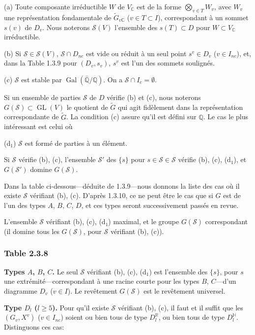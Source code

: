 \documentclass[12pt,a4paper]{article}
\theoremstyle{plain}
\theoremstyle{definition}
\theoremstyle{remark}
\DeclareMathOperator{\GL}{GL}
\DeclareMathOperator{\Gal}{Gal}
\newcommand{\QQ}{\mathbb{Q}}
\newcommand{\RR}{\mathbb{R}}
\newcommand{\CC}{\mathbb{C}}
\begin{document}
(a) Toute composante irr\'eductible $W$ de $V_{\CC}$ est de la forme $\bigotimes_{v \in T} W_v$, avec $W_v$ une repr\'esentation fondamentale de $\tilde{G}_{v\CC}$ ($v \in T \subset I$), correspondant \`a un sommet $s(v)$ de $D_v$. Nous noterons $\mathcal{S}(V)$ l'ensemble des $s(T) \subset D$ pour $W \subset V_{\CC}$ irr\'eductible.

(b) Si $\mathcal{S} \in \mathcal{S}(V)$, $\mathcal{S} \cap D_{nc}$ est vide ou r\'eduit \`a un seul point $s^v \in D_v$ ($v \in I_{nc}$), et, dans la Table 1.3.9 pour $(D_v, s_v)$, $s^v$ est l'un des sommets soulign\'es.

(c) $\mathcal{S}$ est stable par $\Gal(\overline{\QQ}/\QQ)$. On a $\mathcal{S} \cap I_c = \emptyset$.

Si un ensemble de parties $\mathcal{S}$ de $D$ v\'erifie (b) et (c), nous noterons $G(\mathcal{S}) \subset \GL(V)$ le quotient de $\tilde{G}$ qui agit fid\`element dans la repr\'esentation correspondante de $\tilde{G}$. La condition (c) assure qu'il est d\'efini sur $\QQ$. Le cas le plus int\'eressant est celui o\`u

(d$_1$) $\mathcal{S}$ est form\'e de parties \`a un \'el\'ement.

Si $\mathcal{S}$ v\'erifie (b), (c), l'ensemble $\mathcal{S}'$ des $\{s\}$ pour $s \in \mathcal{S} \in \mathcal{S}$ v\'erifie (b), (c), (d$_1$), et $G(\mathcal{S}')$ domine $G(\mathcal{S})$.

Dans la table ci-dessous---d\'eduite de 1.3.9---nous donnons la liste des cas o\`u il existe $\mathcal{S}$ v\'erifiant (b), (c). D'apr\`es 1.3.10, ce ne peut \^etre le cas que si $G$ est de l'un des types $A$, $B$, $C$, $D$, et ces types seront successivement pass\'es en revue.

L'ensemble $\mathcal{S}$ v\'erifiant (b), (c), (d$_1$) maximal, et le groupe $G(\mathcal{S})$ correspondant (il domine tous les $G(\mathcal{S})$, pour $\mathcal{S}$ v\'erifiant (b), (c)).

\subsubsection*{Table 2.3.8}

\textbf{Types $A$, $B$, $C$.} Le seul $\mathcal{S}$ v\'erifiant (b), (c), (d$_1$) est l'ensemble des $\{s\}$, pour $s$ une extr\'emit\'e---correspondant \`a une racine courte pour les types $B$, $C$---d'un diagramme $D_v$ ($v \in I$). Le rev\^etement $G(\mathcal{S})$ est le rev\^etement universel.

\textbf{Type $D_l$ ($l \ge 5$).} Pour qu'il existe $\mathcal{S}$ v\'erifiant (b), (c), il faut et il suffit que les $(G_v, X^v)$ ($v \in I_{nc}$) soient ou bien tous de type $D_l^{\RR}$, ou bien tous de type $D_l^{\mathbb{H}}$. Distinguons ces cas:
\end{document}
